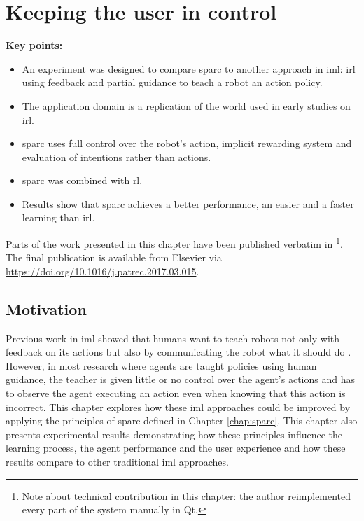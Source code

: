 \chapter{Keeping the user in control}\label{chap:control}

\graphicspath{{images/control/}}

\newcommand{\nosemic}{\SetEndCharOfAlgoLine{\relax}}%
\newcommand{\dosemic}{\SetEndCharOfAlgoLine{\string;}}%
\newcommand{\pushline}{\Indp}%
\newcommand{\popline}{\Indm\dosemic}%

\begin{framed}
	\textbf{Key points:}
	
	\begin{itemize}
		\item An experiment was designed to compare \gls{sparc} to another approach in \gls{iml}: \acrfull{irl} using feedback and partial guidance to teach a robot an action policy.
		\item The application domain is a replication of the world used in early studies on \acrshort{irl}.
		\item \gls{sparc} uses full control over the robot's action, implicit rewarding system and evaluation of intentions rather than actions.
		\item \gls{sparc} was combined with \acrlong{rl}.
		\item Results show that \gls{sparc} achieves a better performance, an easier and a faster learning than \acrshort{irl}.
	\end{itemize}
\end{framed}

Parts of the work presented in this chapter have been published verbatim in \cite{senft2017supervised} \footnote{Note about technical contribution in this chapter: the author reimplemented every part of the system manually in Qt.}. The final publication is available from Elsevier via \url{https://doi.org/10.1016/j.patrec.2017.03.015}.

\newpage
\section{Motivation}

Previous work in \acrfull{iml} showed that humans want to teach robots not only with feedback on its actions but also by communicating the robot what it should do \citep{thomaz2008teachable}. However, in most research where agents are taught policies using human guidance, the teacher is given little or no control over the agent's actions and has to observe the agent executing an action even when knowing that this action is incorrect. This chapter explores how these \gls{iml} approaches could be improved by applying the principles of \gls{sparc} defined in Chapter \ref{chap:sparc}. This chapter also presents experimental results demonstrating how these principles influence the learning process, the agent performance and the user experience and how these results compare to other traditional \gls{iml} approaches.


